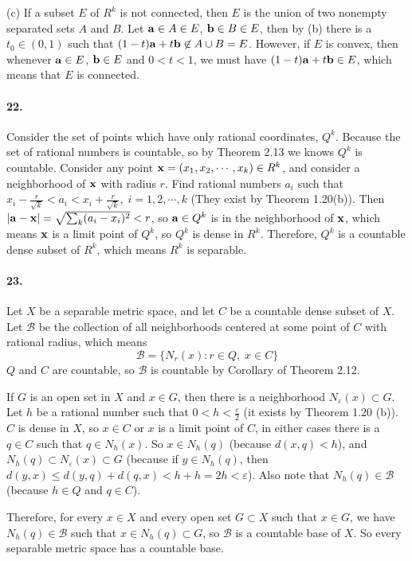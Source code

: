 \documentclass[a4paper]{article}
\begin{document}
(c) If a subset $E$ of $R^k$ is not connected, then $E$ is the union of two nonempty separated sets $A$ and $B$. Let $\mathbf{a}\in A\in E$, $\mathbf{b}\in B\in E$, then by (b) there is a $t_0\in(0,1)$ such that $(1-t)\mathbf{a}+t\mathbf{b}\not\in A\cup B=E$. However, if $E$ is convex, then whenever $\mathbf{a}\in E$, $\mathbf{b}\in E$ and $0<t<1$, we must have $(1-t)\mathbf{a}+t\mathbf{b}\in E$, which means that $E$ is connected.

\paragraph{22.}
Consider the set of points which have only rational coordinates, $Q^k$. Because the set of rational numbers is countable, so by Theorem 2.13 we knows $Q^k$ is countable. Consider any point $\mathbf{x}=(x_1,x_2,\cdots,x_k)\in R^k$, and consider a neighborhood of $\mathbf{x}$ with radius $r$. Find rational numbers $a_i$ such that $x_i-\frac{r}{\sqrt{k}}<a_i<x_i+\frac{r}{\sqrt{k}},\;i=1,2,\cdots,k$ (They exist by Theorem 1.20(b)). Then $|\mathbf{a}-\mathbf{x}|=\sqrt{\sum_k(a_i -x_i)^2}<r$, so $\mathbf{a}\in Q^k$ is in the neighborhood of $\mathbf{x}$, which means $\mathbf{x}$ is a limit point of $Q^k$, so $Q^k$ is dense in $R^k$. Therefore, $Q^k$ is a countable dense subset of $R^k$, which means $R^k$ is separable.

\paragraph{23.}
Let $X$ be a separable metric space, and let $C$ be a countable dense subset of $X$. Let $\mathcal{B}$ be the collection of all neighborhoods centered at some point of $C$ with rational radius, which means
\[
\mathcal{B}=\{N_r(x):r\in Q,\;x\in C \}
\]
$Q$ and $C$ are countable, so $\mathcal{B}$ is countable by Corollary of Theorem 2.12.

If $G$ is an open set in $X$ and $x\in G$, then there is a neighborhood $N_{\varepsilon}(x)\subset G$. Let $h$ be a rational number such that $0<h<\frac{\varepsilon}{2}$ (it exists by Theorem 1.20 (b)). $C$ is dense in $X$, so $x\in C$ or $x$ is a limit point of $C$, in either cases there is a $q\in C$ such that $q\in N_h(x)$. So $x\in N_h(q)$ (because $d(x,q)<h$), and $N_h(q)\subset N_\varepsilon(x)\subset G$ (because if $y\in N_h(q)$, then $d(y,x)\leq d(y,q)+d(q,x)<h+h=2h<\varepsilon$). Also note that $N_h(q)\in\mathcal{B}$ (because $h\in Q$ and $q\in C$).

Therefore, for every $x\in X$ and every open set $G\subset X$ such that $x\in G$, we have $N_h(q)\in\mathcal{B}$ such that $x\in N_h(q)\subset G$, so $\mathcal{B}$ is a countable base of $X$. So every separable metric space has a countable base.
\end{document}
